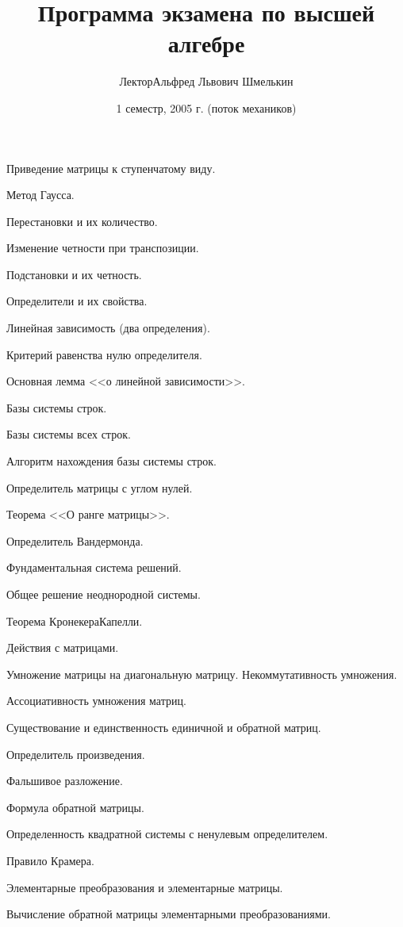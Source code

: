 \documentclass[a4paper]{article}
\title{Программа экзамена по высшей алгебре}
\author{Лектор\т Альфред Львович Шмелькин}
\date{1 семестр, 2005 г. (поток механиков)}
\begin{document}
\maketitle
\begin{nums}{-1}
\item Приведение матрицы к ступенчатому виду.
\item Метод Гаусса.
\item Перестановки и их количество.
\item Изменение четности при транспозиции.
\item Подстановки и их четность.
\item Определители и их свойства.
\item Линейная зависимость (два определения).
\item Критерий равенства нулю определителя.
\item Основная лемма <<о линейной зависимости>>.
\item Базы системы строк.
\item Базы системы всех строк.
\item  Алгоритм нахождения базы системы строк.
\item  Определитель матрицы с углом нулей.
\item  Теорема <<О ранге матрицы>>.
\item  Определитель Вандермонда.
\item  Фундаментальная система решений.
\item  Общее решение неоднородной системы.
\item  Теорема Кронекера\ч Капелли.
\item  Действия с матрицами.
\item  Умножение матрицы на диагональную матрицу. Некоммутативность умножения.
\item  Ассоциативность умножения матриц.
\item  Существование и единственность единичной и обратной матриц.
\item  Определитель произведения.
\item  Фальшивое разложение.
\item  Формула обратной матрицы.
\item  Определенность квадратной системы с ненулевым определителем.
\item  Правило Крамера.
\item  Элементарные преобразования и элементарные матрицы.
\item  Вычисление обратной матрицы элементарными преобразованиями.

\end{nums}
\end{document}
